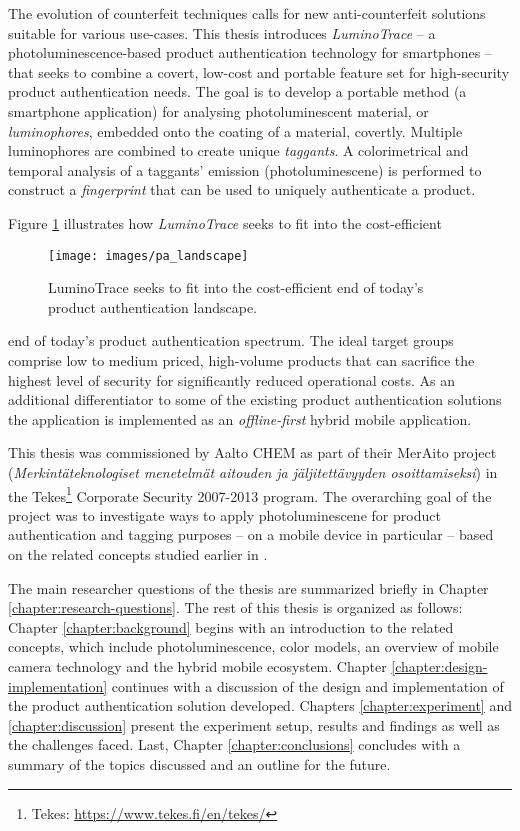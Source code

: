 \documentclass[thesis.tex]{subfiles}
\begin{document}
\enlargethispage{2\baselineskip}
The evolution of counterfeit techniques calls for new anti-counterfeit solutions suitable for various use-cases. This thesis introduces \emph{LuminoTrace} -- a photoluminescence-based product authentication technology for smartphones -- that seeks to combine a covert, low-cost and portable feature set for high-security product authentication needs. The goal is to develop a portable method (a smartphone application) for analysing photoluminescent material, or \emph{luminophores}, embedded onto the coating of a material, covertly. Multiple luminophores are combined to create unique \emph{taggants}. A colorimetrical and temporal analysis of a taggants' emission (photoluminescene) is performed to construct a \emph{fingerprint} that can be used to uniquely authenticate a product.

Figure \ref{figure:production_authentication_landscape} illustrates how \emph{LuminoTrace} seeks to fit into the cost-efficient

\begin{figure}[h!]
\centering \texttt{[image: images/pa\_landscape]}
\vspace{-8mm}
\caption{LuminoTrace seeks to fit into the cost-efficient end of today's product authentication landscape.}
\label{figure:production_authentication_landscape}
\end{figure}

\noindent end of today's product authentication spectrum. The ideal target groups comprise low to medium priced, high-volume products that can sacrifice the highest level of security for significantly reduced operational costs. As an additional differentiator to some of the existing product authentication solutions the application is implemented as an \emph{offline-first} hybrid mobile application.

This thesis was commissioned by Aalto CHEM as part of their MerAito project (\emph{Merkintäteknologiset menetelmät aitouden ja jäljitettävyyden osoittamiseksi}) in the Tekes\footnote{Tekes: \url{https://www.tekes.fi/en/tekes/}} Corporate Security 2007-2013 program. The overarching goal of the project was to investigate ways to apply photoluminescene for product authentication and tagging purposes -- on a mobile device in particular -- based on the related concepts studied earlier in \cite{kuosmanen}.

The main researcher questions of the thesis are summarized briefly in Chapter \ref{chapter:research-questions}. The rest of this thesis is organized as follows: Chapter \ref{chapter:background} begins with an introduction to the related concepts, which include photoluminescence, color models, an overview of mobile camera technology and the hybrid mobile ecosystem. Chapter \ref{chapter:design-implementation} continues with a discussion of the design and implementation of the product authentication solution developed. Chapters \ref{chapter:experiment} and \ref{chapter:discussion} present the experiment setup, results and findings as well as the challenges faced. Last, Chapter \ref{chapter:conclusions} concludes with a summary of the topics discussed and an outline for the future.
\end{document}
